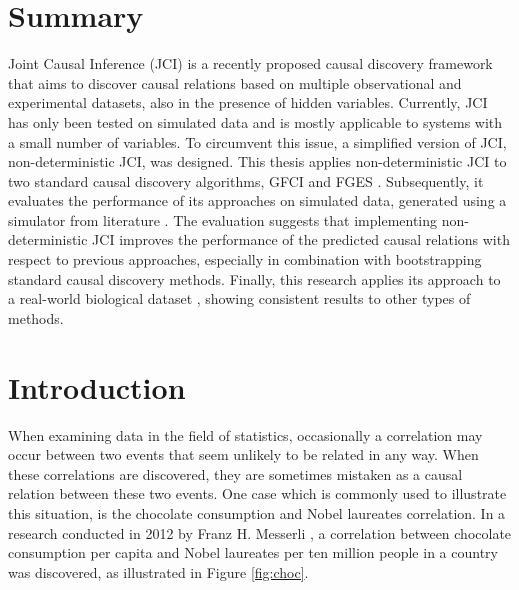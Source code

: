 \documentclass[a4paper,pdf]{article}
\begin{document}
\newpage

\section*{Summary}
Joint Causal Inference (JCI) \cite{jci} is a recently proposed causal discovery framework that aims to discover causal relations based on multiple observational and experimental datasets, also in the presence of hidden variables. Currently, JCI has only been tested on simulated data and is mostly applicable to systems with a small number of variables. To circumvent this issue, a simplified version of JCI, non-deterministic JCI, was designed. This thesis applies non-deterministic JCI to two standard causal discovery algorithms, GFCI and FGES \cite{gfci}. Subsequently, it evaluates the performance of its approaches on simulated data, generated using a simulator from literature \cite{jci}. The evaluation suggests that implementing non-deterministic JCI improves the performance of the predicted causal relations with respect to  previous approaches, especially in combination with bootstrapping standard causal discovery methods. Finally, this research applies its approach to a real-world biological dataset  \cite{sachs2005causal}, showing consistent results to other types of methods.

\newpage
\tableofcontents

\newpage
\section{Introduction}
When examining data in the field of statistics, occasionally a correlation may occur between two events that seem unlikely to be related in any way. When these correlations are discovered, they are sometimes mistaken as a causal relation between these two events. 
One case which is commonly used to illustrate this situation, is the chocolate consumption and Nobel laureates correlation. In a research conducted in 2012 by Franz H. Messerli \cite{nobelchocolate}, a correlation between chocolate consumption per capita and Nobel laureates per ten million people in a country was discovered, as illustrated in Figure \ref{fig:choc}.
\end{document}
